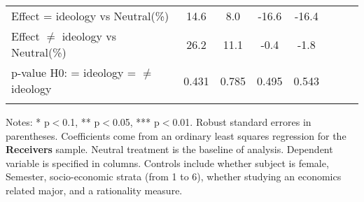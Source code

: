 \begin{table}[H]
{\begin{threeparttable}
\begin{tabular}{lccccccc}
\midrule
Effect = ideology vs Neutral(\%)&        14.6         &         8.0         &       -16.6         &       -16.4         \\
Effect $\neq$ ideology vs Neutral(\%)&        26.2         &        11.1         &        -0.4         &        -1.8         \\
p-value H0: = ideology = $\neq$ ideology&       0.431         &       0.785         &       0.495         &       0.543         \\
\bottomrule[0.5pt]                                                                               \label{tab:table2}                                                                       \end{tabular}                                                                                                    \vspace{-13pt}                                                                                           \begin{tablenotes}[flushleft]{\setlength{\itemindent}{-3pt}}          \small                                                                                                           \item Notes: * p$<$0.1, ** p$<$0.05, *** p$<$0.01. Robust standard errores in parentheses. Coefficients come from an ordinary least squares regression for the \textbf{Receivers} sample. Neutral treatment is the baseline of analysis. Dependent variable is specified in columns. Controls include whether subject is female, Semester, socio-economic strata (from 1 to 6), whether studying an economics related major, and a rationality measure.          \end{tablenotes}                                                                                         \end{threeparttable}                                                                             }                                                                                                                        \end{table}
